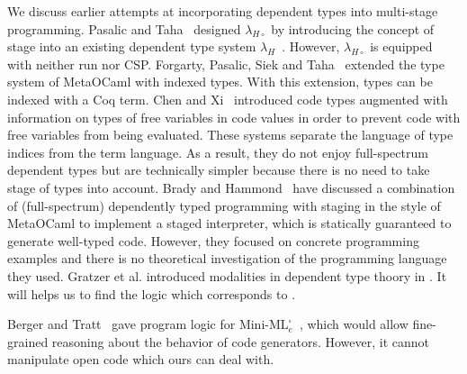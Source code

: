 
We discuss earlier attempts at incorporating dependent types into
multi-stage programming.  Pasalic and Taha~\cite{pasalic2002tagless}
designed \(\lambda_{H\circ}\) by introducing the concept of stage into
an existing dependent type system
\(\lambda_H\)~\cite{zhong2002certified}.  However,
\(\lambda_{H\circ}\) is equipped with neither run nor CSP.  Forgarty,
Pasalic, Siek and Taha~\cite{fogarty2007concoqtion} extended the type
system of MetaOCaml with indexed types.  With this extension, types
can be indexed with a Coq term.  Chen and Xi~\cite{chen2003meta}
introduced code types augmented with information on types of free
variables in code values in order to prevent code with free variables
from being evaluated.  These systems separate the language of type
indices from the term language.  As a result, they do not enjoy
full-spectrum dependent types but are technically simpler because
there is no need to take stage of types into account.  Brady and
Hammond~\cite{brady2006dependently} have discussed a combination of
(full-spectrum) dependently typed programming with staging in the
style of MetaOCaml to implement a staged interpreter, which is
statically guaranteed to generate well-typed code.  However, they
focused on concrete programming examples and there is no theoretical
investigation of the programming language they used. Gratzer et al. introduced modalities in dependent type thoory in \cite{gratzer2019modaldependent}. It will helps us to find the logic which corresponds to \LMD.

Berger and Tratt~\cite{martin2015HGRTMP} gave program logic for
\(\text{Mini-ML}^\square_e\)~\cite{DaviesPfenning01JACM}, which would
allow fine-grained reasoning about the behavior of code generators.
However, it cannot manipulate open code which ours can deal with.


